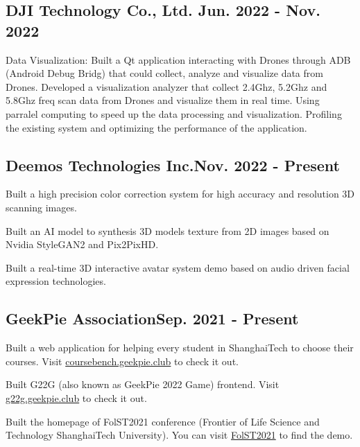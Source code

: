 \documentclass[a4paper,12pt]{article}
\begin{document}


\vspace*{10pt}
\subsection{{ DJI Technology Co., Ltd. }\hfill Jun. 2022 - Nov. 2022}
\begin{zitemize}
\item Data Visualization: Built a Qt application interacting with Drones through ADB (Android Debug Bridg) that could collect, analyze and visualize data from Drones. Developed a visualization analyzer that collect 2.4Ghz, 5.2Ghz and 5.8Ghz freq scan data from Drones and visualize them in real time. Using parralel computing to speed up the data processing and visualization. Profiling the existing system and optimizing the performance of the application.
\end{zitemize}

\vspace*{6pt}
\subsection{{Deemos Technologies Inc.}\hfill Nov. 2022 - Present}
\begin{zitemize}
\item Built a high precision color correction system for high accuracy and resolution 3D scanning images.
\item Built an AI model to synthesis 3D models texture from 2D images based on Nvidia StyleGAN2 and Pix2PixHD.
\item Built a real-time 3D interactive avatar system demo based on audio driven facial expression technologies.
\end{zitemize}

\vspace*{6pt}
\subsection{{GeekPie Association}\hfill Sep. 2021 - Present}
\begin{zitemize}
\item Built a web application for helping every student in ShanghaiTech to choose their courses. Visit \href{https://coursebench.geekpie.club}{coursebench.geekpie.club} to check it out.
\item Built G22G (also known as GeekPie 2022 Game) frontend. Visit \href{https://g22g.geekpie.club}{g22g.geekpie.club} to check it out.
\item Built the homepage of FolST2021 conference (Frontier of Life Science and Technology ShanghaiTech University). You can visit \href{https://clarivy.github.io}{FolST2021} to find the demo.
\end{zitemize}
\end{document}
